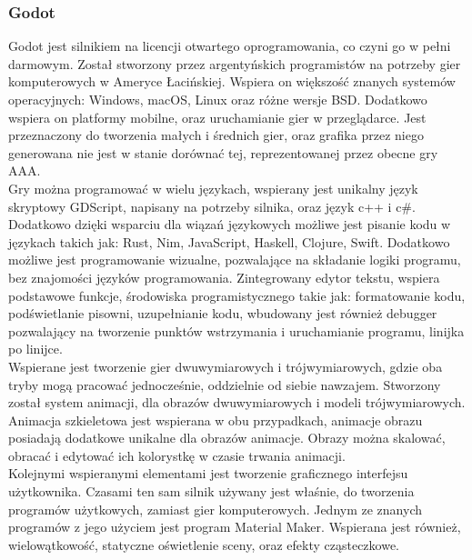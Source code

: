 \documentclass{article} %
\begin{document}
        
        \subsubsection*{Godot}
        Godot jest silnikiem na licencji otwartego oprogramowania, co czyni go w pełni darmowym. Został stworzony przez argentyńskich programistów na potrzeby gier komputerowych w Ameryce Łacińskiej. Wspiera on większość znanych systemów operacyjnych: Windows, macOS, Linux oraz różne wersje BSD. Dodatkowo wspiera on platformy mobilne, oraz uruchamianie gier w przeglądarce. Jest przeznaczony do tworzenia małych i średnich gier, oraz grafika przez niego generowana nie jest w stanie dorównać tej, reprezentowanej przez obecne gry AAA.
        \\
        
        Gry można programować w wielu językach, wspierany jest unikalny język skryptowy GDScript, napisany na potrzeby silnika, oraz język c++ i c\#. Dodatkowo dzięki wsparciu dla wiązań językowych możliwe jest pisanie kodu w językach takich jak: Rust, Nim, JavaScript, Haskell, Clojure, Swift. Dodatkowo możliwe jest programowanie wizualne, pozwalające na składanie logiki programu, bez znajomości języków programowania. Zintegrowany edytor tekstu, wspiera podstawowe funkcje, środowiska programistycznego takie jak: formatowanie kodu, podświetlanie pisowni, uzupełnianie kodu, wbudowany jest również debugger pozwalający na tworzenie punktów wstrzymania i uruchamianie programu, linijka po linijce.
        \\
        
        Wspierane jest tworzenie gier dwuwymiarowych i trójwymiarowych, gdzie oba tryby mogą pracować jednocześnie, oddzielnie od siebie nawzajem. Stworzony został system animacji, dla obrazów dwuwymiarowych i modeli trójwymiarowych. Animacja szkieletowa jest wspierana w obu przypadkach, animacje obrazu posiadają dodatkowe unikalne dla obrazów animacje. Obrazy można skalować, obracać i edytować ich kolorystkę w czasie trwania animacji. 
        \\
        
        Kolejnymi wspieranymi elementami jest tworzenie graficznego interfejsu użytkownika. Czasami ten sam silnik używany jest właśnie, do tworzenia programów użytkowych, zamiast gier komputerowych. Jednym ze znanych programów z jego użyciem jest program Material Maker.\cite{material} Wspierana jest również, wielowątkowość, statyczne oświetlenie sceny, oraz efekty cząsteczkowe.
        \\
        
\end{document}
